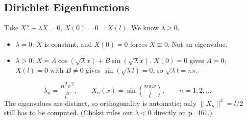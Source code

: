 \documentclass{article}
\begin{document}
\subsection{Dirichlet Eigenfunctions}
Take $X'' + \lambda X = 0$, $X(0) = 0 = X(l)$. We know $\lambda \geq 0$.
\begin{itemize}
    \item $\lambda = 0$: $X$ is constant, and $X(0) = 0$ forces $X \equiv 0$. Not an eigenvalue.
    \item $\lambda > 0$: $X = A\cos(\sqrt\lambda x) + B\sin(\sqrt\lambda x)$. $X(0) = 0$ gives $A = 0$; $X(l) = 0$ with $B \neq 0$ gives $\sin(\sqrt\lambda l) = 0$, so $\sqrt\lambda l = n\pi$.
\end{itemize}
\begin{equation}
    \lambda_n = \frac{n^2\pi^2}{l^2}, \qquad X_n(x) = \sin\left(\frac{n\pi x}{l}\right), \qquad n = 1, 2, \dots
\end{equation}
The eigenvalues are distinct, so orthogonality is automatic; only $\|X_n\|^2 = l/2$ still has to be computed. (Choksi rules out $\lambda < 0$ directly on p.~461.)
\end{document}
